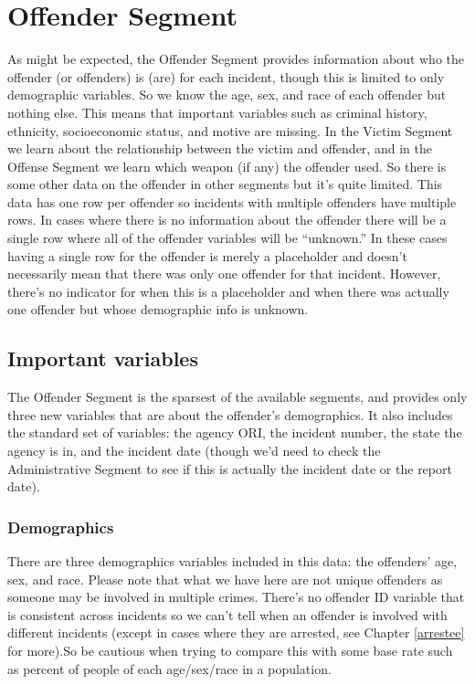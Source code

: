 \documentclass[
  12pt,
  openany]{book}
\begin{document}
\hypertarget{offender-segment-1}{%
\chapter{Offender Segment}\label{offender-segment-1}}

As might be expected, the Offender Segment provides information about who the offender (or offenders) is (are) for each incident, though this is limited to only demographic variables. So we know the age, sex, and race of each offender but nothing else. This means that important variables such as criminal history, ethnicity, socioeconomic status, and motive are missing. In the Victim Segment we learn about the relationship between the victim and offender, and in the Offense Segment we learn which weapon (if any) the offender used. So there is some other data on the offender in other segments but it's quite limited. This data has one row per offender so incidents with multiple offenders have multiple rows. In cases where there is no information about the offender there will be a single row where all of the offender variables will be ``unknown.'' In these cases having a single row for the offender is merely a placeholder and doesn't necessarily mean that there was only one offender for that incident. However, there's no indicator for when this is a placeholder and when there was actually one offender but whose demographic info is unknown.

\hypertarget{important-variables-2}{%
\section{Important variables}\label{important-variables-2}}

The Offender Segment is the sparsest of the available segments, and provides only three new variables that are about the offender's demographics. It also includes the standard set of variables: the agency ORI, the incident number, the state the agency is in, and the incident date (though we'd need to check the Administrative Segment to see if this is actually the incident date or the report date).

\hypertarget{demographics}{%
\subsection{Demographics}\label{demographics}}

There are three demographics variables included in this data: the offenders' age, sex, and race. Please note that what we have here are not unique offenders as someone may be involved in multiple crimes. There's no offender ID variable that is consistent across incidents so we can't tell when an offender is involved with different incidents (except in cases where they are arrested, see Chapter \ref{arrestee} for more).So be cautious when trying to compare this with some base rate such as percent of people of each age/sex/race in a population.
\end{document}
